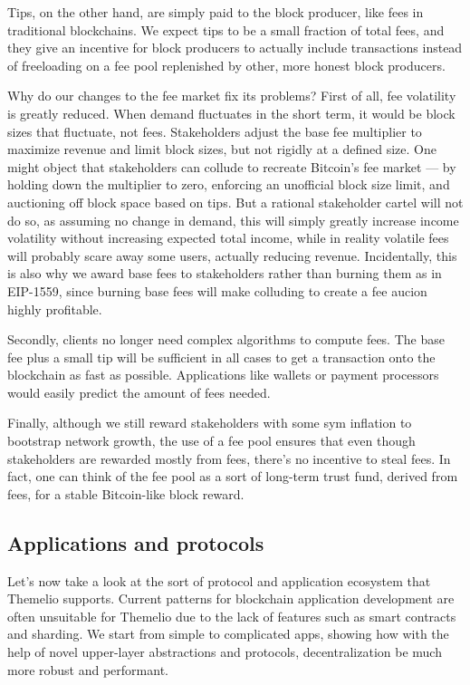 \documentclass[]{article}
\begin{document}
Tips, on the other hand, are simply paid to the block producer, like
fees in traditional blockchains. We expect tips to be a small fraction
of total fees, and they give an incentive for block producers to
actually include transactions instead of freeloading on a fee pool
replenished by other, more honest block producers.

Why do our changes to the fee market fix its problems? First of all, fee
volatility is greatly reduced. When demand fluctuates in the short term,
it would be block sizes that fluctuate, not fees. Stakeholders adjust
the base fee multiplier to maximize revenue and limit block sizes, but
not rigidly at a defined size. One might object that stakeholders can
collude to recreate Bitcoin's fee market --- by holding down the
multiplier to zero, enforcing an unofficial block size limit, and
auctioning off block space based on tips. But a rational stakeholder
cartel will not do so, as assuming no change in demand, this will simply
greatly increase income volatility without increasing expected total
income, while in reality volatile fees will probably scare away some
users, actually reducing revenue. Incidentally, this is also why we
award base fees to stakeholders rather than burning them as in EIP-1559,
since burning base fees will make colluding to create a fee aucion
highly profitable.

Secondly, clients no longer need complex algorithms to compute fees. The
base fee plus a small tip will be sufficient in all cases to get a
transaction onto the blockchain as fast as possible. Applications like
wallets or payment processors would easily predict the amount of fees
needed.

Finally, although we still reward stakeholders with some sym inflation
to bootstrap network growth, the use of a fee pool ensures that even
though stakeholders are rewarded mostly from fees, there's no incentive
to steal fees. In fact, one can think of the fee pool as a sort of
long-term trust fund, derived from fees, for a stable Bitcoin-like block
reward.

\hypertarget{applications-and-protocols}{%
\subsection{Applications and
protocols}\label{applications-and-protocols}}

Let's now take a look at the sort of protocol and application ecosystem
that Themelio supports. Current patterns for blockchain application
development are often unsuitable for Themelio due to the lack of
features such as smart contracts and sharding. We start from simple to
complicated apps, showing how with the help of novel upper-layer
abstractions and protocols, decentralization be much more robust and
performant.
\end{document}
